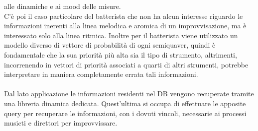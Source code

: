 alle dinamiche e ai mood delle misure.\\
C'è poi il caso particolare del batterista
che non ha alcun interesse riguardo le informazioni inerenti alla linea melodica 
e aromica di un improvvisazione, ma è interessato solo alla linea ritmica. Inoltre
per il batterista viene utilizzato un modello diverso di vettore di probabilità 
di ogni semiquaver, quindi è fondamentale che la sua priorità più alta sia il tipo 
di strumento, altrimenti, incorrenendo in vettori di priorità associati a quarti di
altri strumenti, potrebbe interpretare in maniera completamente errata tali informazioni.\\\\
Dal lato applicazione le informazioni residenti nel DB vengono recuperate tramite
una libreria dinamica dedicata. Quest'ultima si occupa di effettuare le apposite
query per recuperare le informazioni, con i dovuti vincoli, necessarie ai processi 
musicti e direttori per improvvissare.
